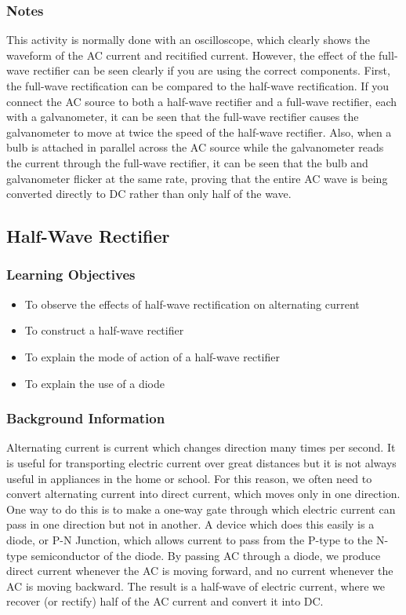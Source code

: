 \subsubsection*{Notes}
This activity is normally done with an oscilloscope, which clearly shows the waveform of the AC current and recitified current.  However, the effect of the full-wave rectifier can be seen clearly if you are using the correct components.
First, the full-wave rectification can be compared to the half-wave rectification.  If you connect the AC source to both a half-wave rectifier and a full-wave rectifier, each with a galvanometer, it can be seen that the full-wave rectifier causes the galvanometer to move at twice the speed of the half-wave rectifier.
Also, when a bulb is attached in parallel across the AC source while the galvanometer reads the current through the full-wave rectifier, it can be seen that the bulb and galvanometer flicker at the same rate, proving that the entire AC wave is being converted directly to DC rather than only half of the wave.

\subsection{Half-Wave Rectifier}

\subsubsection*{Learning Objectives}
\begin{itemize}
\item{To observe the effects of half-wave rectification on alternating current}
\item{To construct a half-wave rectifier}
\item{To explain the mode of action of a half-wave rectifier}
\item{To explain the use of a diode}
\end{itemize}

\subsubsection*{Background Information}
Alternating current is current which changes direction many times per second.  It is useful for transporting electric current over great distances but it is not always useful in appliances in the home or school.  For this reason, we often need to convert alternating current into direct current, which moves only in one direction.
One way to do this is to make a one-way gate through which electric current can pass in one direction but not in another.  A device which does this easily is a diode, or P-N Junction, which allows current to pass from the P-type to the N-type semiconductor of the diode.  By passing AC through a diode, we produce direct current whenever the AC is moving forward, and no current whenever the AC is moving backward.  The result is a half-wave of electric current, where we recover (or rectify) half of the AC current and convert it into DC.

